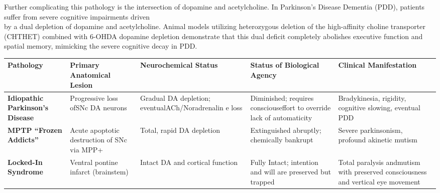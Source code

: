 Further complicating this pathology is the intersection of dopamine and acetylcholine. In Parkinson's Disease Dementia (PDD), patients suffer from severe cognitive impairments driven\\
by a dual depletion of dopamine and acetylcholine. Animal models utilizing heterozygous deletion of the high-affinity choline transporter (CHTHET) combined with 6-OHDA dopamine depletion demonstrate that this dual deficit completely abolishes executive function and spatial memory, mimicking the severe cognitive decay in PDD.

{\def\LTcaptype{none} %
\begin{longtable}[]{@{}
  >{\raggedright\arraybackslash}p{}
  >{\raggedright\arraybackslash}p{}
  >{\raggedright\arraybackslash}p{}
  >{\raggedright\arraybackslash}p{}
  >{\raggedright\arraybackslash}p{}@{}}
\toprule\noalign{}
\begin{minipage}[b]{\linewidth}\raggedright
Pathology
\end{minipage} & \begin{minipage}[b]{\linewidth}\raggedright
Primary Anatomical Lesion
\end{minipage} & \begin{minipage}[b]{\linewidth}\raggedright
Neurochemical Status
\end{minipage} & \begin{minipage}[b]{\linewidth}\raggedright
Status of Biological Agency
\end{minipage} & \begin{minipage}[b]{\linewidth}\raggedright
Clinical Manifestation
\end{minipage} \\
\midrule\noalign{}
\endhead
\bottomrule\noalign{}
\endlastfoot
\textbf{Idiopathic Parkinson's Disease} & Progressive loss ofSNc DA neurons & Gradual DA depletion; eventualACh/Noradrenalin e loss & Diminished; requires consciouseffort to override lack of automaticity & Bradykinesia, rigidity, cognitive slowing, eventual PDD \\
\textbf{MPTP ``Frozen Addicts''} & Acute apoptotic destruction of SNc via MPP+ & Total, rapid DA depletion & Extinguished abruptly; chemically bankrupt & Severe parkinsonism, profound akinetic mutism \\
\textbf{Locked-In Syndrome} & Ventral pontine infarct (brainstem) & Intact DA and cortical function & Fully Intact; intention and will are preserved but trapped & Total paralysis andmutism with preserved consciousness and vertical eye movement \\
\end{longtable}
}

